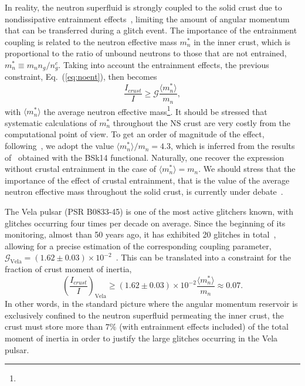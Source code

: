 In reality, the neutron superfluid is strongly coupled to the solid crust due
to nondissipative entrainment effects~\cite{Chamel2013}, limiting the amount of
angular momentum that can be transferred during a glitch event. The importance
of the entrainment coupling is related to the neutron effective mass $m_n^*$ in
the inner crust, which is proportional to the ratio of unbound neutrons to 
those that are not entrained, $m_n^* \equiv m_n n_g/n_g^c$. Taking into 
account the entrainment effects, the previous constraint, Eq.~(\ref{eq:noent}), 
then becomes~\cite{Carter2005,Andersson2012}
%
\begin{equation}
  \frac{I_{crust}}{I} \geq \mathcal{G}\frac{\langle m_n^*
  \rangle}{m_n},\label{eq:ifrac_g}
\end{equation}
%
with $\langle m_n^* \rangle$ the average neutron effective
mass\footnote{}.
It should be stressed that systematic calculations of $m_n^*$ throughout 
the NS crust are very costly from the computational point of view. To get an 
order of magnitude of the effect, 
following~\cite{Andersson2012,Piekarewicz2014}, we adopt the 
value $\langle m_n^* \rangle /m_n = 4.3$, which is inferred from the 
results of~\cite{Chamel2012} obtained with the BSk14 functional. 
Naturally, one recover the expression without 
crustal entrainment in the case of $\langle m_n^* \rangle = m_n$. We should 
stress that the importance of the effect of crustal entrainment, that is the 
value of the average neutron effective mass throughout the solid crust, is 
currently under debate~\cite{Martin2016,Watanabe2017}.

The Vela pulsar (PSR B0833-45) is one of the most active glitchers known, with
glitches occurring four times per decade on average. Since the beginning of its 
monitoring, almost than 50 years ago, it has exhibited 20 glitches in
total~\cite{Glitches}, allowing for a precise estimation of the corresponding 
coupling parameter, $\mathcal{G}_{\text{Vela}} = (1.62 \pm 0.03) \times
10^{-2}$~\cite{Ho2015}. This can be translated into a constraint for 
the fraction of crust moment of inertia,
%
\begin{equation}
  \left(\frac{I_{crust}}{I}\right)_{\text{Vela}} \geq (1.62 \pm 0.03) \times 10^{-2}
  \frac{\langle m_n^* \rangle}{m_n} \approx 0.07.
\end{equation}
%
In other words, in the standard picture where the angular momentum reservoir is 
exclusively confined to the neutron superfluid permeating the inner crust, the 
crust must store more than $7\%$ (with entrainment effects included) of the 
total moment of inertia in order to justify the large glitches occurring in the 
Vela pulsar.

